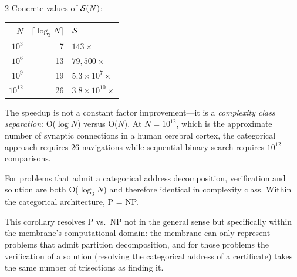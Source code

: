 \begin{multicols}{2}
Concrete values of $\mathcal{S}(N)$:

\begin{center}
\begin{tabular}{rrl}
\toprule
$N$ & $\lceil\log_3 N\rceil$ & $\mathcal{S}$ \\
\midrule
$10^3$  & 7   & $143\times$       \\
$10^6$  & 13  & $79{,}500\times$  \\
$10^9$  & 19  & $5.3 \times 10^7\times$   \\
$10^{12}$ & 26 & $3.8 \times 10^{10}\times$ \\
\bottomrule
\end{tabular}
\end{center}

The speedup is not a constant factor improvement---it is a \emph{complexity class separation}: O($\log N$) versus O($N$). At $N = 10^{12}$, which is the approximate number of synaptic connections in a human cerebral cortex, the categorical approach requires $26$ navigations while sequential binary search requires $10^{12}$ comparisons.

\begin{corollary}[P = NP for Categorical Problems]
\label{cor:pnp}
For problems that admit a categorical address decomposition, verification and solution are both O($\log_3 N$) and therefore identical in complexity class. Within the categorical architecture, P = NP.
\end{corollary}

This corollary resolves P vs.\ NP not in the general sense but specifically within the membrane's computational domain: the membrane can only represent problems that admit partition decomposition, and for those problems the verification of a solution (resolving the categorical address of a certificate) takes the same number of trisections as finding it.

\end{multicols}

